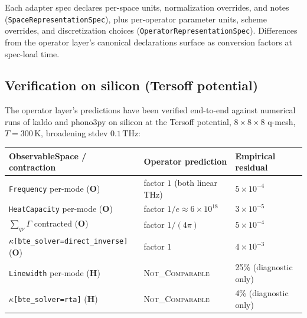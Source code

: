 \documentclass[11pt,a4paper]{article}
\begin{document}
Each adapter spec declares per-space units, normalization overrides, and notes
(\texttt{SpaceRepresentationSpec}), plus per-operator parameter units, scheme
overrides, and discretization choices (\texttt{OperatorRepresentationSpec}). Differences
from the operator layer's canonical declarations surface as conversion factors at
spec-load time.

\subsection{Verification on silicon (Tersoff potential)}
\label{ssec:silicon-verification}

The operator layer's predictions have been verified end-to-end against numerical
runs of kaldo and phono3py on silicon at the Tersoff potential, $8\times 8\times 8$
q-mesh, $T = 300\,\text{K}$, broadening stdev $0.1\,\text{THz}$:

\begin{center}
\begin{tabular}{lll}
\toprule
ObservableSpace / contraction & Operator prediction & Empirical residual \\
\midrule
\texttt{Frequency} per-mode (\textbf{O})            & factor $1$ (both linear THz)  & $5\times 10^{-4}$ \\
\texttt{HeatCapacity} per-mode (\textbf{O})         & factor $1/e \approx 6\times 10^{18}$ & $3\times 10^{-5}$ \\
$\sum_{q\nu}\Gamma$ contracted (\textbf{O})          & factor $1/(4\pi)$              & $5\times 10^{-4}$ \\
$\kappa$\texttt{[bte\_solver=direct\_inverse]} (\textbf{O})\footnotemark{} & factor $1$                & $4\times 10^{-3}$ \\
\midrule
\texttt{Linewidth} per-mode (\textbf{H})            & \textsc{Not\_Comparable} & 25\% (diagnostic only) \\
$\kappa$\texttt{[bte\_solver=rta]} (\textbf{H})     & \textsc{Not\_Comparable} & 4\% (diagnostic only) \\
\bottomrule
\end{tabular}
\end{center}
\end{document}
